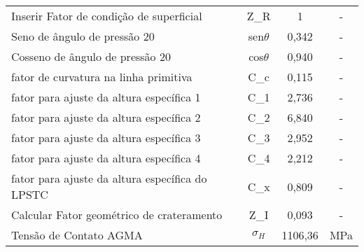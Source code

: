 \begin{table}[]
\begin{tabular}{lccc}
Inserir Fator de condição de superficial                                                                                     & Z_R             & 1              & -             \\
Seno de ângulo de pressão 20                                                                                                 & sen$\theta$           & 0,342          & -             \\
Cosseno de ângulo de pressão 20                                                                                              & cos$\theta$           & 0,940          & -             \\
fator de curvatura na linha primitiva                                                                                        & C_c             & 0,115          & -             \\
fator para ajuste da altura específica 1                                                                                     & C_1             & 2,736          & -             \\
fator para ajuste da altura específica 2                                                                                     & C_2             & 6,840          & -             \\
fator para ajuste da altura específica 3                                                                                     & C_3             & 2,952          & -             \\
fator para ajuste da altura específica 4                                                                                     & C_4             & 2,212          & -             \\
fator para ajuste da altura específica do LPSTC                                                                              & C_x             & 0,809          & -             \\
Calcular Fator geométrico de crateramento                                                                                    & Z_I             & 0,093          & -             \\
Tensão de Contato AGMA                                                                                                       & $\sigma_H$              & 1106,36        & MPa             \\ \hline  
\end{tabular}
\end{table}